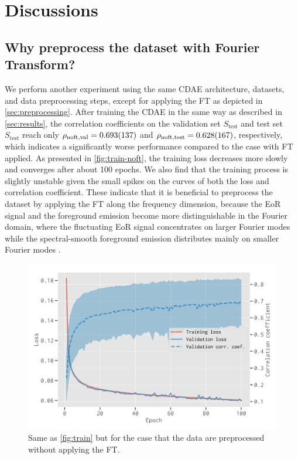 \documentclass[fleqn,usenatbib]{mnras}
\newlength{\myfigwidth}
\newcommand{\R}[1]{\mathrm{#1}}
\newcommand{\editwip}[1]{{\leavevmode\color{magenta}#1}}
\begin{document}
\section{Discussions}
\label{sec:discussions}

\subsection{Why preprocess the dataset with Fourier Transform?}
\label{sec:why-ft}

We perform another experiment using the same CDAE architecture,
datasets, and data preprocessing steps, except for applying the FT
as depicted in \autoref{sec:preprocessing}.
After training the CDAE in the same way as described in
\autoref{sec:results}, \editwip{the correlation coefficients on the
validation set $S_{\R{test}}$ and test set $S_{\R{test}}$ reach only
$\rho_{\R{noft,val}} = \num{0.693 +- 0.137}$ and
$\rho_{\R{noft,test}} = \num{0.628 +- 0.167}$, respectively,
which indicates a significantly worse performance compared to the case with
FT applied.  As presented in \autoref{fig:train-noft}, the training loss
decreases more slowly and converges after about 100 epochs.} %
We also find that the training process is slightly unstable given the small
spikes on the curves of both the loss and correlation coefficient.
These indicate that it is beneficial to preprocess the
dataset by applying the FT along the frequency dimension, because the
EoR signal and the foreground emission become more distinguishable
in the Fourier domain, where the fluctuating EoR signal concentrates on
larger Fourier modes while the spectral-smooth foreground emission
distributes mainly on smaller Fourier modes \citep[e.g.,][]{parsons2012}.

\begin{figure}
  \centering
  \includegraphics[width=\myfigwidth]{cdae-train-noft}
  \caption{\label{fig:train-noft}%
    Same as \autoref{fig:train} but for the case that the data are
    preprocessed without applying the FT.
  }
\end{figure}
\end{document}
